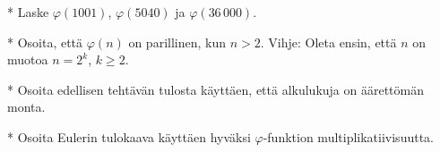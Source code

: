 \begin{kotitehtavasivu}
\begin{tehtava}
    * Laske $\varphi(1001)$, $\varphi(5040)$ ja $\varphi(36\,000)$.
\end{tehtava}

\begin{tehtava}
    * Osoita, että $\varphi(n)$ on parillinen, kun $n>2$. Vihje: Oleta ensin, että $n$ on muotoa $n=2^k$, $k\ge 2$.
\end{tehtava}

\begin{tehtava}
    * Osoita edellisen tehtävän tulosta käyttäen, että alkulukuja on äärettömän monta.
\end{tehtava}

\begin{tehtava}
    * Osoita Eulerin tulokaava käyttäen hyväksi  $\varphi$-funktion multiplikatiivisuutta.
\end{tehtava}

\end{kotitehtavasivu}
